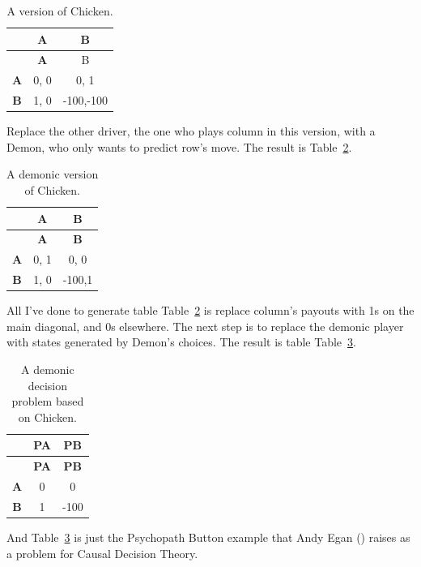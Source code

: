 \documentclass[
  12pt,
  letterpaper,
  DIV=11,
  numbers=noendperiod]{scrreprt}
\begin{document}
\begin{longtable}[]{@{}ccc@{}}
\caption{A version of Chicken.}\label{tbl-basic-chicken}\tabularnewline
\toprule\noalign{}
& \textbf{A} & B \\
\midrule\noalign{}
\endfirsthead
\toprule\noalign{}
& \textbf{A} & B \\
\midrule\noalign{}
\endhead
\bottomrule\noalign{}
\endlastfoot
\textbf{A} & 0, 0 & 0, 1 \\
\textbf{B} & 1, 0 & -100,-100 \\
\end{longtable}

Replace the other driver, the one who plays column in this version, with
a Demon, who only wants to predict row's move. The result is
Table~\ref{tbl-demon-chicken}.

\begin{longtable}[]{@{}ccc@{}}
\caption{A demonic version of
Chicken.}\label{tbl-demon-chicken}\tabularnewline
\toprule\noalign{}
& \textbf{A} & \textbf{B} \\
\midrule\noalign{}
\endfirsthead
\toprule\noalign{}
& \textbf{A} & \textbf{B} \\
\midrule\noalign{}
\endhead
\bottomrule\noalign{}
\endlastfoot
\textbf{A} & 0, 1 & 0, 0 \\
\textbf{B} & 1, 0 & -100,1 \\
\end{longtable}

All I've done to generate table Table~\ref{tbl-demon-chicken} is replace
column's payouts with 1s on the main diagonal, and 0s elsewhere. The
next step is to replace the demonic player with states generated by
Demon's choices. The result is table Table~\ref{tbl-egan-game}.

\begin{longtable}[]{@{}ccc@{}}
\caption{A demonic decision problem based on
Chicken.}\label{tbl-egan-game}\tabularnewline
\toprule\noalign{}
& \textbf{PA} & \textbf{PB} \\
\midrule\noalign{}
\endfirsthead
\toprule\noalign{}
& \textbf{PA} & \textbf{PB} \\
\midrule\noalign{}
\endhead
\bottomrule\noalign{}
\endlastfoot
\textbf{A} & 0 & 0 \\
\textbf{B} & 1 & -100 \\
\end{longtable}

And Table~\ref{tbl-egan-game} is just the Psychopath Button example that
Andy Egan () raises as a problem for
Causal Decision Theory.
\end{document}
